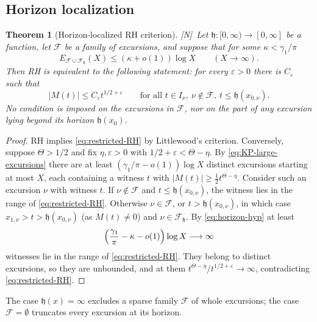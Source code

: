\documentclass[11pt]{amsart}
\numberwithin{equation}{section}
\theoremstyle{plain}
\newtheorem{theorem}{Theorem}[section]
\theoremstyle{definition}
\theoremstyle{remark}
\newcommand{\eps}{\varepsilon}
\newcommand{\F}{\mathcal{F}}
\newcommand{\tagN}{\textup{[N]}}
\begin{document}
\subsection{Horizon localization}
\label{subsec:horizon}

\begin{theorem}[Horizon-localized RH criterion]
\label{thm:horizon}
\tagN\ Let $\mathfrak h:[0,\infty)\to[0,\infty]$ be a function, let $\F$ be a family
of excursions, and suppose that for some $\kappa<\gamma_1/\pi$
\begin{equation}
\label{eq:horizon-hyp}
E_{\F\cup\F_{\mathfrak h}}(X)\le(\kappa+o(1))\log X\qquad(X\to\infty).
\end{equation}
Then RH is equivalent to the following statement: for every $\eps>0$ there
is $C_\eps$ such that
\begin{equation}
\label{eq:restricted-RH}
|M(t)|\le C_\eps t^{1/2+\eps}
\qquad\text{for all }t\in I_\nu,\ \nu\notin\F,\ t\le \mathfrak h(x_{0,\nu}).
\end{equation}
No condition is imposed on the excursions in $\F$, nor on the part of any
excursion lying beyond its horizon $\mathfrak h(x_0)$.
\end{theorem}

\begin{proof}
RH implies \eqref{eq:restricted-RH} by Littlewood's criterion. Conversely,
suppose $\Theta>1/2$ and fix $\eta,\eps>0$ with
$1/2+\eps<\Theta-\eta$. By \eqref{eq:KP-large-excursions} there are at least
$(\gamma_1/\pi-o(1))\log X$ distinct excursions starting at most $X$, each
containing a witness $t$ with $|M(t)|\ge\frac12t^{\Theta-\eta}$. Consider
such an excursion $\nu$ with witness $t$. If $\nu\notin\F$ and
$t\le \mathfrak h(x_{0,\nu})$, the witness lies in the range of
\eqref{eq:restricted-RH}. Otherwise $\nu\in\F$, or $t>\mathfrak h(x_{0,\nu})$, in
which case $x_{1,\nu}>t>\mathfrak h(x_{0,\nu})$ (as $M(t)\ne0$) and $\nu\in\F_{\mathfrak h}$. By
\eqref{eq:horizon-hyp} at least
\[
\Bigl(\frac{\gamma_1}{\pi}-\kappa-o(1)\Bigr)\log X\longrightarrow\infty
\]
witnesses lie in the range of \eqref{eq:restricted-RH}. They belong to
distinct excursions, so they are unbounded, and at them
$t^{\Theta-\eta}/t^{1/2+\eps}\to\infty$, contradicting
\eqref{eq:restricted-RH}.
\end{proof}

The case $\mathfrak h(x)=\infty$ excludes a sparse family $\F$ of whole excursions;
the case $\F=\emptyset$ truncates every excursion at its horizon.
\end{document}
